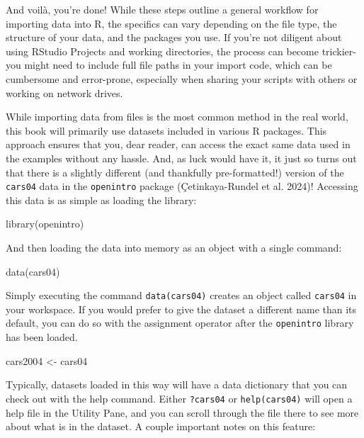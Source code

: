 \documentclass[
  letterpaper,
]{book}
\newenvironment{Shaded}{\begin{snugshade}}{\end{snugshade}}
\newcommand{\FunctionTok}[1]{\textcolor[rgb]{0.28,0.35,0.67}{#1}}
\newcommand{\NormalTok}[1]{\textcolor[rgb]{0.00,0.23,0.31}{#1}}
\newcommand{\OtherTok}[1]{\textcolor[rgb]{0.00,0.23,0.31}{#1}}
\begin{document}
And voilà, you're done! While these steps outline a general workflow for
importing data into R, the specifics can vary depending on the file
type, the structure of your data, and the packages you use. If you're
not diligent about using RStudio Projects and working directories, the
process can become trickier-you might need to include full file paths in
your import code, which can be cumbersome and error-prone, especially
when sharing your scripts with others or working on network drives.

While importing data from files is the most common method in the real
world, this book will primarily use datasets included in various R
packages. This approach ensures that you, dear reader, can access the
exact same data used in the examples without any hassle. And, as luck
would have it, it just so turns out that there is a slightly different
(and thankfully pre-formatted!) version of the \texttt{cars04} data in
the \texttt{openintro} package (Çetinkaya-Rundel et al. 2024)! Accessing
this data is as simple as loading the library:

\begin{Shaded}
\begin{Highlighting}[]
\FunctionTok{library}\NormalTok{(openintro) }
\end{Highlighting}
\end{Shaded}

And then loading the data into memory as an object with a single
command:

\begin{Shaded}
\begin{Highlighting}[]
\FunctionTok{data}\NormalTok{(cars04)}
\end{Highlighting}
\end{Shaded}

Simply executing the command \texttt{data(cars04)} creates an object
called \texttt{cars04} in your workspace. If you would prefer to give
the dataset a different name than its default, you can do so with the
assignment operator after the \texttt{openintro} library has been
loaded.

\begin{Shaded}
\begin{Highlighting}[]
\NormalTok{cars2004 }\OtherTok{\textless{}{-}}\NormalTok{ cars04}
\end{Highlighting}
\end{Shaded}

Typically, datasets loaded in this way will have a data dictionary that
you can check out with the help command. Either \texttt{?cars04} or
\texttt{help(cars04)} will open a help file in the Utility Pane, and you
can scroll through the file there to see more about what is in the
dataset. A couple important notes on this feature:
\end{document}
